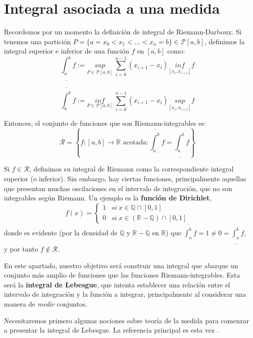 \documentclass[11pt, a4paper]{article}
\newif\IfInSansMode
\theoremstyle{theorem-style}
\theoremstyle{definition-style}
\theoremstyle{remark-style}
\theoremstyle{example-style}
\begin{document}
\newpage



\section{Integral asociada a una medida}

Recordemos por un momento la definición de integral de Riemann-Darboux. Si tenemos una partición $P = \{ a = x_0 < x_1 < \dots < x_n = b\} \in \mathcal P [a,b]$, definimos la integral superior e inferior de una función $f$ en $[a,b]$ como: $$\underline{\int_a^b} f := \underset{P \in \mathcal P [a,b]}{sup} \ \sum_{i=0}^{n-1} (x_{i+1} - x_i) \underset{[x_i, x_{i+1}]}{inf} f$$

$$\overline {\int_a^b} f := \underset{P \in \mathcal P [a,b]}{inf} \ \sum_{i=0}^{n-1} (x_{i+1} - x_i) \underset{[x_i, x_{i+1}]}{sup} f$$

Entonces, el conjunto de funciones que son Riemann-integrables es: $$\mathcal R = \left\{ f:[a,b] \to \mathbb{R} \text{ acotada} : \overline {\int_a^b} f = \underline {\int_a^b} f\right\}$$

Si $f \in \mathcal R$, definimos su integral de Riemann como la correspondiente integral superior (o inferior). Sin embargo, hay ciertas funciones, principalmente aquellas que presentan muchas oscilaciones en el intervalo de integración, que no son integrables según Riemann. Un ejemplo es la \textbf{función de Dirichlet}, $$f(x) = \begin{cases} 1 & si \ x \in \mathbb Q \cap [0,1]\\ 0 & si \ x \in (\mathbb{R} - \mathbb Q) \cap [0,1] \end{cases}$$ donde es evidente (por la densidad de $\mathbb Q$ y $\mathbb{R} - \mathbb Q$ en $\mathbb{R}$) que $\displaystyle \overline {\int_a^b} f = 1 \ne 0 = \underline {\int_a^b} f$, y por tanto $f \notin \mathcal R$.

En este apartado, nuestro objetivo será construir una integral que abarque un conjunto más amplio de funciones que las funciones Riemann-integrables. Esta será la \textbf{integral de Lebesgue}, que intenta establecer una relación entre el intervalo de integración y la función a integrar, principalmente al considerar una manera de \textit{medir} conjuntos.

Necesitaremos primero algunas nociones sobre teoría de la medida para comenzar a presentar la integral de Lebesgue. La referencia principal es esta vez \cite[Chapter 1]{rudin}.
\end{document}
